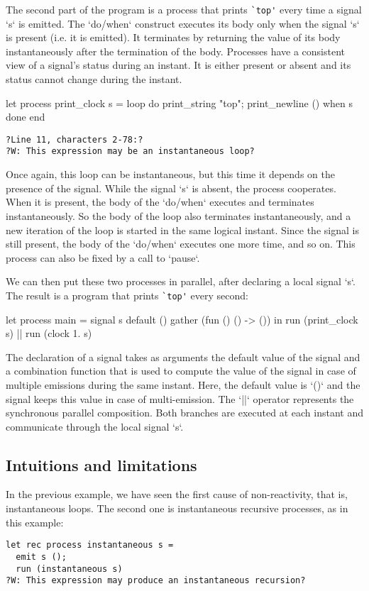 \documentclass[9pt,preprint]{sigplanconf}
\begin{document}
The second part of the program is a process that prints \verb+`top'+ every time a signal `s` is emitted. 
The `do/when` construct executes its body only when the signal `s` is present (i.e. it is emitted). It terminates by returning the value of its body instantaneously after the termination of the body. Processes have a consistent view of a signal's status during an instant. It is either present or absent and its status cannot change during the instant.
%
\begin{rmlcl}[10]
let process print_clock s =
  loop
    do
      print_string "top"; print_newline ()
    when s done
  end
\end{rmlcl}
\begin{lstlisting}
?Line 11, characters 2-78:?
?W: This expression may be an instantaneous loop?
\end{lstlisting}
%
Once again, this loop can be instantaneous, but this time it depends on the presence of the signal. While the signal `s` is absent, the process cooperates. When it is present, the body of the `do/when` executes and terminates instantaneously. So the body of the loop also terminates instantaneously, and a new iteration of the loop is started in the same logical instant. Since the signal is still present, the body of the `do/when` executes one more time, and so on. This process can also be fixed by a call to `pause`.

We can then put these two processes in parallel, after declaring a local signal `s`. The result is a program that prints \verb+`top'+ every second:
\begin{rmlcl}[17]
let process main =
  signal s default () gather (fun () () -> ()) in
  run (print_clock s) || run (clock 1. s)
\end{rmlcl}
The declaration of a signal takes as arguments the default value of the signal and a combination function that is used to compute the value of the signal in case of multiple emissions during the same instant. Here, the default value is `()` and the signal keeps this value in case of multi-emission. The `||` operator represents the synchronous parallel composition. Both branches are executed at each instant and communicate through the local signal `s`.

\subsection{Intuitions and limitations}
\label{sec:intuition}

In the previous example, we have seen the first cause of non-reactivity, that is, instantaneous loops. The second one is instantaneous recursive processes, as in this example:
\begin{lstlisting}
let rec process instantaneous s =
  emit s ();
  run (instantaneous s)
?W: This expression may produce an instantaneous recursion?
\end{lstlisting}
\end{document}
